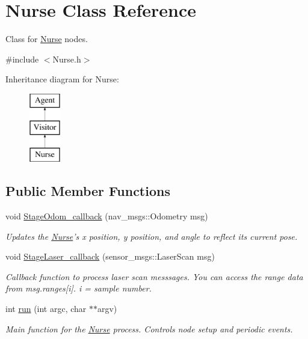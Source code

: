 \hypertarget{classNurse}{\section{Nurse Class Reference}
\label{classNurse}
}


Class for \hyperlink{classNurse}{Nurse} nodes.  




{\ttfamily \#include $<$Nurse.\-h$>$}

Inheritance diagram for Nurse\-:\begin{figure}[H]
\begin{center}
\leavevmode
\includegraphics[height=3.000000cm]{classNurse}
\end{center}
\end{figure}
\subsection*{Public Member Functions}
\begin{DoxyCompactItemize}
\item 
void \hyperlink{classNurse_a3ff47edb35f171a538fe62b3abdca948}{Stage\-Odom\-\_\-callback} (nav\-\_\-msgs\-::\-Odometry msg)
\begin{DoxyCompactList}\small\item\em Updates the \hyperlink{classNurse}{Nurse}'s x position, y position, and angle to reflect its current pose. \end{DoxyCompactList}\item 
void \hyperlink{classNurse_aa709fbc5dc09b8db82db59c1a2829d4a}{Stage\-Laser\-\_\-callback} (sensor\-\_\-msgs\-::\-Laser\-Scan msg)
\begin{DoxyCompactList}\small\item\em Callback function to process laser scan messsages. You can access the range data from msg.\-ranges\mbox{[}i\mbox{]}. i = sample number. \end{DoxyCompactList}\item 
\hypertarget{classNurse_a73f9edde8df4beb33b9810034faead0c}{int \hyperlink{classNurse_a73f9edde8df4beb33b9810034faead0c}{run} (int argc, char $\ast$$\ast$argv)}\label{classNurse_a73f9edde8df4beb33b9810034faead0c}

\begin{DoxyCompactList}\small\item\em Main function for the \hyperlink{classNurse}{Nurse} process. Controls node setup and periodic events. \end{DoxyCompactList}\end{DoxyCompactItemize}
